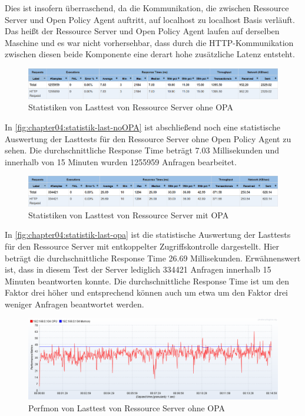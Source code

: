Dies ist insofern überraschend, da die Kommunikation, die zwischen Ressource Server und Open Policy Agent auftritt, auf localhost zu localhost Basis verläuft. Das heißt der Ressource Server und Open Policy Agent laufen auf derselben Maschine und es war nicht vorhersehbar, dass durch die HTTP-Kommunikation zwischen diesen beide Komponente eine derart hohe zusätzliche Latenz entsteht. 

\begin{figure}[H]
  \centering
  \includegraphics[width=1.0\textwidth]{gfx/statistik-last-noOPA.png}
  \caption{Statistiken von Lasttest von Ressource Server ohne OPA}
  \label{fig:chapter04:statistik-last-noOPA}
\end{figure}

In \autoref{fig:chapter04:statistik-last-noOPA} ist abschließend noch eine statistische Auswertung der Lasttests für den Ressource Server ohne Open Policy Agent zu sehen. Die durchschnittliche Response Time beträgt 7.03 Millisekunden und innerhalb von 15 Minuten wurden 1255959 Anfragen bearbeitet. 

\begin{figure}[H]
  \centering
  \includegraphics[width=1.0\textwidth]{gfx/statistik-last-opa.png}
  \caption{Statistiken von Lasttest von Ressource Server mit OPA}
  \label{fig:chapter04:statistik-last-opa}
\end{figure}

In \autoref{fig:chapter04:statistik-last-opa} ist die statistische Auswertung der Lasttests für den Ressource Server mit entkoppelter Zugriffskontrolle dargestellt. Hier beträgt die durchschnittliche Response Time 26.69 Millisekunden. Erwähnenswert ist, dass in diesem Test der Server lediglich 334421 Anfragen innerhalb 15 Minuten beantworten konnte. Die durchschnittliche Response Time ist um den Faktor drei höher und entsprechend können auch um etwa um den Faktor drei weniger Anfragen beantwortet werden.

\begin{figure}[H]
  \centering
  \includegraphics[width=1.0\textwidth]{gfx/perfmon-last-noOPA.png}
  \caption{Perfmon von Lasttest von Ressource Server ohne OPA}
  \label{fig:chapter04:perfmon-last-noOPA}
\end{figure}

